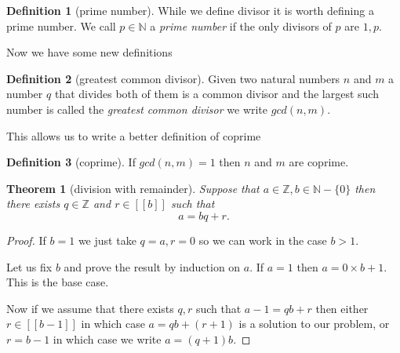 \documentclass[
]{book}
\newtheorem{theorem}{Theorem}[chapter]
\theoremstyle{definition}
\newtheorem{definition}{Definition}[chapter]
\theoremstyle{definition}
\theoremstyle{definition}
\theoremstyle{definition}
\theoremstyle{remark}
\begin{document}
\begin{definition}[prime number]
While we define divisor it is worth defining a prime number. We call \(p \in \mathbb{N}\) a \emph{prime number} if the only divisors of \(p\) are \(1, p\).
\end{definition}

Now we have some new definitions

\begin{definition}[greatest common divisor]
Given two natural numbers \(n\) and \(m\) a number \(q\) that divides both of them is a common divisor and the largest such number is called the \emph{greatest common divisor} we write \(gcd(n,m)\).
\end{definition}

This allows us to write a better definition of coprime

\begin{definition}[coprime]
If \(gcd(n,m)=1\) then \(n\) and \(m\) are coprime.
\end{definition}

\begin{theorem}[division with remainder]
Suppose that \(a \in \mathbb{Z}, b \in \mathbb{N}-\{0\}\) then there exists \(q \in \mathbb{Z}\) and \(r \in [[b]]\) such that
\[ a =bq+r.  \]
\end{theorem}

\begin{proof}
If \(b=1\) we just take \(q=a, r=0\) so we can work in the case \(b >1\).

Let us fix \(b\) and prove the result by induction on \(a\). If \(a=1\) then \(a=0\times b+1\). This is the base case.

Now if we assume that there exists \(q,r\) such that \(a-1 = qb +r\) then either \(r \in [[b-1]]\) in which case \(a = qb + (r+1)\) is a solution to our problem, or \(r=b-1\) in which case we write \(a = (q+1)b\).
\end{proof}
\end{document}
